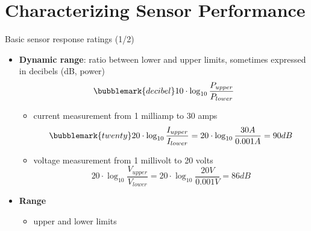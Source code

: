 \documentclass[compress]{beamer}
\begin{document}
\section[Characterizing Performance]{Characterizing Sensor Performance}\label{characterizing-sensor-performance}

\begin{frame}{Basic sensor response ratings (1/2)}

    \begin{itemize}
        \item {\bf Dynamic range}: ratio between lower and upper limits, sometimes expressed
              in decibels (dB, power)
              \[
                  \bubblemark{decibel}10\cdot \log_{10}\frac{P_{upper}}{P_{lower}}
              \]


              \begin{itemize}

                  \item<2->
                  \eg current measurement from 1 milliamp to 30 amps
                  \[
                      \bubblemark{twenty}20\cdot\log_{10}\frac{I_{upper}}{I_{lower}}=20\cdot\log_{10}\frac{30A}{0.001A}=90dB
                  \]

                  \item<3->
                  \eg voltage measurement from 1 millivolt to 20 volts
                  \[
                      20\cdot\log_{10}\frac{V_{upper}}{V_{lower}}=20\cdot\log_{10}\frac{20V}{0.001V}=86dB
                  \]
              \end{itemize}

              \item<4-> {\bf Range}
              \begin{itemize}
                  \item upper and lower limits
              \end{itemize}



    \end{itemize}

\end{frame}
\end{document}
